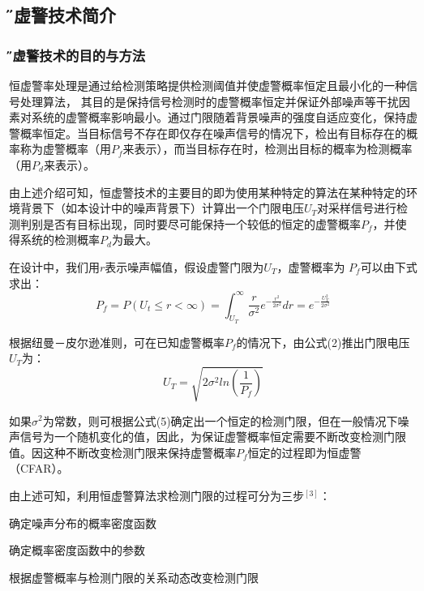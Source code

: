 \documentclass[12pt,a4paper]{article} %
\begin{document}
 	\subsection{\H 恒虚警技术简介}
 	\subsubsection{\H 恒虚警技术的目的与方法 }
 	  恒虚警率处理是通过给检测策略提供检测阈值并使虚警概率恒定且最小化的一种信号处理算法， 其目的是保持信号检测时的虚警概率恒定并保证外部噪声等干扰因素对系统的虚警概率影响最小。通过门限随着背景噪声的强度自适应变化，保持虚警概率恒定。当目标信号不存在即仅存在噪声信号的情况下，检出有目标存在的概率称为虚警概率（用$P_f$来表示），而当目标存在时，检测出目标的概率为检测概率（用$P_d$来表示）。
 	\par 由上述介绍可知，恒虚警技术的主要目的即为使用某种特定的算法在某种特定的环境背景下（如本设计中的噪声背景下）计算出一个门限电压$U_T$对采样信号进行检测判别是否有目标出现，同时要尽可能保持一个较低的恒定的虚警概率$P_f$，并使得系统的检测概率$P_d$为最大。

 	\par 在设计中，我们用$r$表示噪声幅值，假设虚警门限为$U_T$，虚警概率为 $P_f$可以由下式求出：
	\begin{equation}
	P_f =P (U_t \leq r < \infty) = \int_{ U_T }^{  \infty } {\frac{r}{\sigma^2}e^{-\frac{r^2}{2\sigma^2}}dr}  = e^{-\frac{U_T^2}{2\sigma^2}}
	\end{equation}
	
	
	根据纽曼－皮尔逊准则，可在已知虚警概率$P_f$的情况下，由公式(2)推出门限电压$U_T$为：
	\begin{equation}
	U_T=\sqrt{2\sigma^2ln(\frac{1}{P_f})}
	\end{equation}
	
	如果$\sigma^2$为常数，则可根据公式(5)确定出一个恒定的检测门限，但在一般情况下噪声信号为一个随机变化的值，因此，为保证虚警概率恒定需要不断改变检测门限值。因这种不断改变检测门限来保持虚警概率$P_f$恒定的过程即为恒虚警（CFAR）。
	\par 由上述可知，利用恒虚警算法求检测门限的过程可分为三步$^{[3]}$：
	\begin{compactitem} 
 			\item 确定噪声分布的概率密度函数
 			
			\item 确定概率密度函数中的参数

			\item 根据虚警概率与检测门限的关系动态改变检测门限


		 \end{compactitem}	
	
\end{document}
